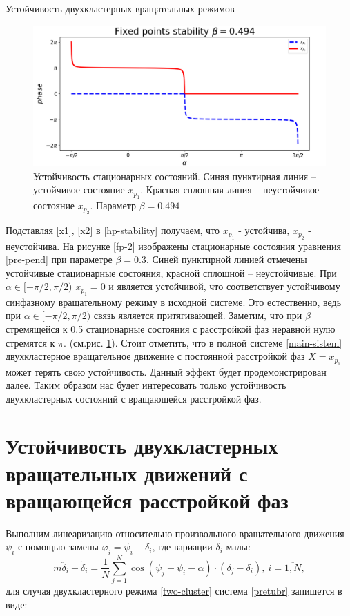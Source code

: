 \begin{chapter}{Устойчивость двухкластерных вращательных режимов}
	\begin{figure}[h!]
		\begin{center}
			\includegraphics[width=1\columnwidth]{pictures/fixed-points-3.png}
		\end{center}
		\caption{Устойчивость стационарных состояний.
		Синяя пунктирная линия -- устойчивое состояние $x_{p_1}$.
		Красная сплошная линия -- неустойчивое состояние $x_{p_2}$.
		Параметр $\beta = 0.494$}
		\label{fp-3}
	\end{figure}
	Подставляя \eqref{x1}, \eqref{x2} в \eqref{hp-stability} получаем, что $x_{p_1}$ - устойчива, $x_{p_2}$ - неустойчива. На рисунке \ref{fp-2} изображены стационарные состояния уравнения \eqref{pre-pend} при параметре $\beta = 0.3$.
	Синей пунктирной линией отмечены устойчивые стационарные состояния,
	красной сплошной -- неустойчивые. При $\alpha \in [-\pi/2, \pi/2)$ $x_{p_1} = 0$ и является устойчивой, что соответствует
	устойчивому синфазному вращательному режиму в исходной системе. Это естественно, ведь при $\alpha \in [-\pi/2, \pi/2)$ связь является
	притягивающей. Заметим, что при $\beta$ стремящейся к 0.5 стационарные состояния с расстройкой фаз неравной нулю стремятся
	к $\pi$. (см.рис. \ref{fp-3}).
	Стоит отметить, что в полной системе \eqref{main-sistem} двухкластерное вращательное движение с постоянной расстройкой фаз $X = x_{p_1}$
	может терять свою устойчивость. Данный эффект будет продемонстрирован далее.
	Таким образом нас будет интересовать только устойчивость двухкластерных состояний с вращающейся расстройкой фаз.
	
	\section{Устойчивость двухкластерных вращательных движений с вращающейся расстройкой фаз}

	Выполним линеаризацию относительно произвольного вращательного движения $\psi_i$ с помощью замены $\varphi_i = \psi_i + \delta_i$, где вариации $\delta_i$ малы:
	\begin{equation} \label{pretubr}
		m\ddot{\delta}_i + \dot{\delta}_i = \frac{1}{N} \sum_{j = 1}^N \cos{(\psi_j - \psi_i - \alpha)} \cdot (\delta_j - \delta_i), \ i = \overline{1, N},
	\end{equation}
	для случая двухкластерного режима \eqref{two-cluster} система \eqref{pretubr} запишется в виде:
	

\end{chapter}
